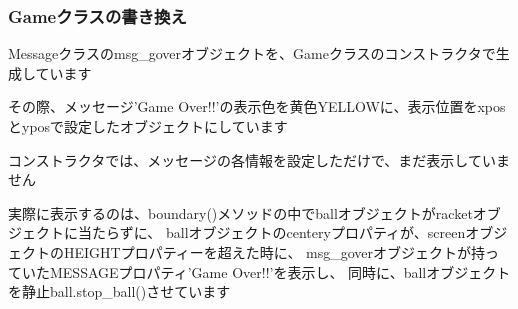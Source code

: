 \documentclass[uplatex,a4paper,11pt,oneside,openany]{jsbook}
\begin{document}
\subsubsection{Gameクラスの書き換え}

Messageクラスのmsg\_goverオブジェクトを、Gameクラスのコンストラクタで生成しています

その際、メッセージ'Game Over!!'の表示色を黄色YELLOWに、表示位置をxposとyposで設定したオブジェクトにしています

コンストラクタでは、メッセージの各情報を設定しただけで、まだ表示していません

実際に表示するのは、boundary()メソッドの中でballオブジェクトがracketオブジェクトに当たらずに、
ballオブジェクトのcenteryプロパティが、screenオブジェクトのHEIGHTプロパティーを超えた時に、
msg\_goverオブジェクトが持っていたMESSAGEプロパティ'Game Over!!'を表示し、
同時に、ballオブジェクトを静止ball.stop\_ball()させています
\end{document}
